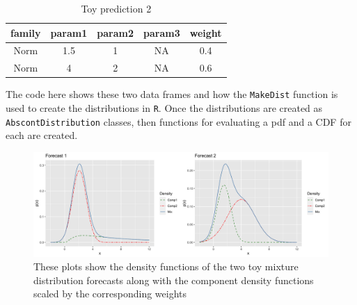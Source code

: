 \documentclass[11pt,notitlepage]{isuthesis}
\begin{document}
\begin{table}[h!]
\centering
 \begin{tabular}{|c|c|c|c|c|}
 \hline
    family & param1 & param2 & param3 & weight
    \\ \hline
    Norm & 1.5 & 1 & NA & 0.4  \\
    Norm & 4 & 2 & NA & 0.6 \\
 \hline
 \end{tabular}
 \caption[Toy prediction 2]{Toy prediction 2}
 \label{tab:preddf2}
\end{table}

The code here shows these two data frames and how the \texttt{MakeDist} 
function is used to create the distributions in \texttt{R}. Once the 
distributions are created as \texttt{AbscontDistribution} classes, then 
functions for evaluating a pdf and a CDF for each are created.


\begin{Schunk}
\end{Schunk}

\begin{figure}[htbp]
\centerline{\includegraphics[scale=.15]{Images/toyfors12.png}}
\caption[Toy mixture distributions]{These plots show the density functions of
the two toy mixture distribution forecasts along with the component density
functions scaled by the corresponding weights}
\label{fig:toymixs}
\end{figure}
\end{document}
